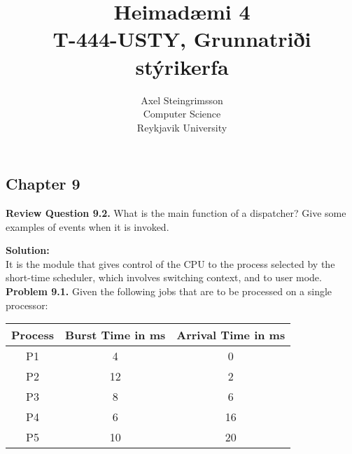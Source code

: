 \documentclass[12pt]{article}
\newcommand{\Problem}[1]{%
	\textbf{Problem #1.}%
}
\newcommand{\Review}[1]{%
	\textbf{Review Question #1.}%
}
\newcommand\Solution{%
	\noindent \textbf{Solution:}\\%
}
\newcommand{\assignmentname}{Heimadæmi 4}
\newcommand{\coursename}{T-444-USTY, Grunnatriði stýrikerfa}
\newcommand{\department}{Computer Science}
\newcommand{\institution}{Reykjavik University}
\begin{document}
\title{\assignmentname \\ { \normalsize {\textsc \coursename}}}
\author{
     Axel Steingrimsson \\ %
      \department \\
      \institution \\
}

\maketitle
\thispagestyle{empty}

\newpage

\subsection*{Chapter 9}

\Review{9.2} What is the main function of a dispatcher? Give some examples of events when it is invoked.

\Solution It is the module that gives control of the CPU to the process selected by the short-time scheduler, which involves switching context, and to user mode.
~\\
\Problem{9.1} Given the following jobs that are to be processed on a single processor:
	\begin{table}[H]
	\centering
		\begin{tabular}{|c|c|c|}
			\hline
			\multicolumn{1}{|l|}{\textbf{Process}} & \textbf{Burst Time in ms} & \multicolumn{1}{l|}{\textbf{Arrival Time in ms}} \\ \hline
			P1	& 4	& 0	\\ \hline
			P2	& 12	& 2	\\ \hline
			P3	& 8	& 6	\\ \hline
			P4	& 6	& 16	\\ \hline
			P5	& 10	& 20	\\ \hline
		\end{tabular}
	\end{table}
	
\end{document}
